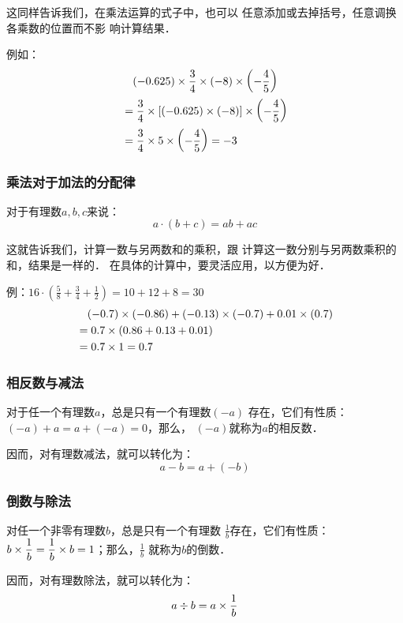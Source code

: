    这同样告诉我们，在乘法运算的式子中，也可以
任意添加或去掉括号，任意调换各乘数的位置而不影
响计算结果．

例如：\[\begin{split}
   &\quad  (-0.625)\times\dfrac{3}{4}\times(-8)\times\left(-\dfrac{4}{5}\right)\\
    &=\dfrac{3}{4}\times[(-0.625)\times(-8)]\times\left(-\dfrac{4}{5}\right)\\
    &=\dfrac{3}{4}\times5\times\left(-\dfrac{4}{5}\right)=-3
\end{split}\]


\subsubsection{乘法对于加法的分配律}
\begin{blk}{}
对于有理数$a,  b,  c$来说：
\[ a\cdot (b+c)=ab+ac\]
\end{blk}

这就告诉我们，计算一数与另两数和的乘积，跟
计算这一数分别与另两数乘积的和，结果是一样的．
在具体的计算中，要灵活应用，以方便为好．

例：$16\cdot \left(\frac{5}{8}+\frac{3}{4}+\frac{1}{2}\right)=10+12+8=30$
\[\begin{split}
   &\quad (-0.7)\times (-0.86)+(-0.13)\times (-0.7)+0.01\times (0.7)\\
    &=0.7\times (0.86+0.13+0.01)\\
    &=0.7\times 1=0.7
\end{split}\]

\subsubsection{相反数与减法}
\begin{blk}{}
对于任一个有理数$a$，总是只有一个有理数$(-a)$
存在，它们有性质：$(-a) +a=a+(-a)=0$，那么，
$(-a)$就称为$a$的相反数．
\end{blk}

因而，对有理数减法，就可以转化为：
        \[a-b=a+(-b)\]

\subsubsection{倒数与除法}
\begin{blk}{}
 对任一个非零有理数$b$，总是只有一个有理数
$\frac{1}{b}$存在，它们有性质：$b\times\dfrac{1}{b}= \dfrac{1}{b} \times b=1$；那么，$\frac{1}{b}$
就称为$b$的倒数．
\end{blk}

因而，对有理数除法，就可以转化为：
\[a\div b=a\times\dfrac{1}{b}\]

